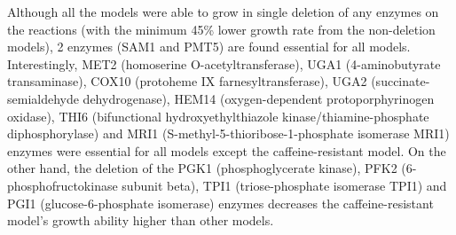 Although all the models were able to grow in single deletion of any enzymes on the reactions (with the minimum 45\% lower growth rate from the non-deletion models), 2 enzymes (SAM1 and PMT5) are found essential for all models. Interestingly, MET2 (homoserine O-acetyltransferase), UGA1 (4-aminobutyrate transaminase), COX10 (protoheme IX farnesyltransferase), UGA2 (succinate-semialdehyde dehydrogenase), HEM14 (oxygen-dependent protoporphyrinogen oxidase), THI6 (bifunctional hydroxyethylthiazole kinase/thiamine-phosphate diphosphorylase) and MRI1 (S-methyl-5-thioribose-1-phosphate isomerase MRI1) enzymes were essential for all models except the caffeine-resistant model. On the other hand, the deletion of the PGK1 (phosphoglycerate kinase), PFK2 (6-phosphofructokinase subunit beta), TPI1 (triose-phosphate isomerase TPI1) and PGI1 (glucose-6-phosphate isomerase) enzymes decreases the caffeine-resistant model's growth ability higher than other models.
